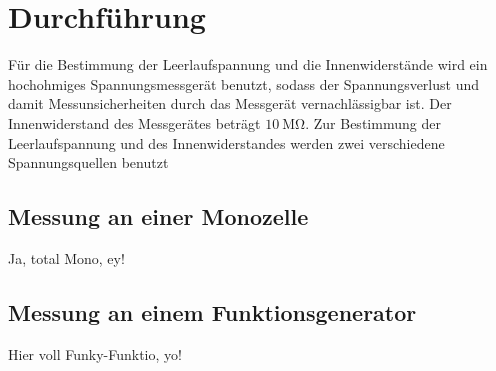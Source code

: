 \section{Durchführung}
\label{sec:Durchfuehrung}
Für die Bestimmung der Leerlaufspannung und die Innenwiderstände wird ein hochohmiges Spannungsmessgerät benutzt, sodass der Spannungsverlust und damit Messunsicherheiten durch das Messgerät vernachlässigbar ist.
Der Innenwiderstand des Messgerätes beträgt $\SI{10}{\mega\ohm}$.
Zur Bestimmung der Leerlaufspannung und des Innenwiderstandes werden zwei verschiedene Spannungsquellen benutzt
\subsection{Messung an einer Monozelle}
Ja, total Mono, ey!
\subsection{Messung an einem Funktionsgenerator}
Hier voll Funky-Funktio, yo!
